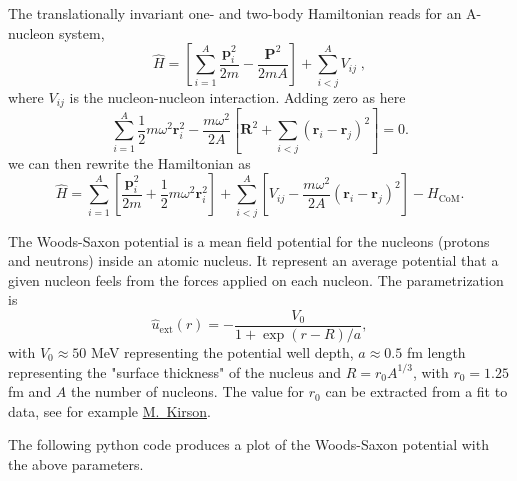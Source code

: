 \documentclass[%
oneside,                 %
final,                   %
10pt]{article}
\begin{document}
 The translationally invariant one- and two-body  Hamiltonian reads for an A-nucleon system,
 \[
\label{eq:ham}
\hat{H}=\left[\sum_{i=1}^A\frac{\bm{p}_i^2}{2m} -\frac{\bm{P}^2}{2mA}\right] +\sum_{i < j}^A V_{ij} \; ,
 \]
 where $V_{ij}$ is the nucleon-nucleon interaction. Adding zero as here
\[
 \sum_{i=1}^A\frac{1}{2}m\omega^2\bm{r}_i^2-
 \frac{m\omega^2}{2A}\left[\bm{R}^2+\sum_{i < j}(\bm{r}_i-\bm{r}_j)^2\right]=0.
 \]
we can then rewrite the Hamiltonian as 
\[
 \hat{H}=\sum_{i=1}^A \left[ \frac{\bm{p}_i^2}{2m}
 +\frac{1}{2}m\omega^2 \bm{r}^2_i
 \right] + \sum_{i < j}^A \left[ V_{ij}-\frac{m\omega^2}{2A}
 (\bm{r}_i-\bm{r}_j)^2
 \right]-H_{\mathrm{CoM}}.
 \]


The Woods-Saxon potential is a mean field potential for the nucleons (protons and neutrons) 
inside an atomic nucleus. It represent an average potential that a given nucleon feels from  the forces applied on each nucleon. 
The parametrization is
\[
\hat{u}_{\mathrm{ext}}(r)=-\frac{V_0}{1+\exp{(r-R)/a}},
\]
with $V_0\approx 50$ MeV representing the potential well depth, $a\approx 0.5$ fm 
length representing the "surface thickness" of the nucleus and $R=r_0A^{1/3}$, with $r_0=1.25$ fm and $A$ the number of nucleons.
The value for $r_0$ can be extracted from a fit to data, see for example \href{{http://www.sciencedirect.com/science/article/pii/S037594740600769X}}{M.~Kirson}.

The following python code produces a plot of the Woods-Saxon potential with the above parameters. 
\end{document}
